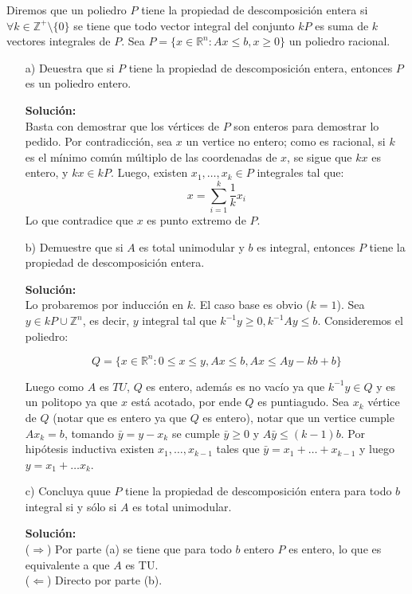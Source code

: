\documentclass[10pt]{article}
\theoremstyle{plain}
\theoremstyle{definition}
\begin{document}
Diremos que un poliedro $P$ tiene la propiedad de descomposición entera si $\forall k \in \mathbb{Z}^{+}\setminus\{0\}$ se tiene que todo vector integral del conjunto $kP$ es suma de $k$ vectores integrales de $P$. Sea $P=\{x\in\mathbb{R}^{n}: Ax\leq b, x\geq 0\}$ un poliedro racional.
\begin{itemize}
    \item[a)] Deuestra que si $P$ tiene la propiedad de descomposición entera, entonces $P$ es un poliedro entero.
    
    \textbf{Solución:}\\
    Basta con demostrar que los vértices de $P$ son enteros para demostrar lo pedido. Por contradicción, sea $x$ un vertice no entero; como es racional, si $k$ es el mínimo común múltiplo de las coordenadas de $x$, se sigue que $kx$ es entero, y $kx\in kP$. Luego, existen $x_{1},\ldots, x_{k}\in P$ integrales tal que:
    \begin{equation*}
        x=\sum_{i=1}^{k}\frac{1}{k}x_{i}
    \end{equation*}
    Lo que contradice que $x$ es punto extremo de $P$.
    \item[b)] Demuestre que si $A$ es total unimodular y $b$ es integral, entonces $P$ tiene la propiedad de descomposición entera.
    
    \textbf{Solución:}\\
    Lo probaremos por inducción en $k$. El caso base es obvio ($k=1$). Sea $y\in kP\cup\mathbb{Z}^{n}$, es decir, $y$ integral tal que $k^{-1}y\geq 0, k^{-1}Ay\leq b$. Consideremos el poliedro:

    \begin{equation*}
    Q = \{x\in \mathbb{R}^{n}:0\leq x \leq y, Ax\leq b, Ax\leq Ay-kb+b\} 
    \end{equation*}

    Luego como $A$ es $TU$, $Q$ es entero, además es no vacío ya que $k^{-1}y\in Q$ y es un politopo ya que $x$ está acotado, por ende $Q$ es puntiagudo. Sea $x_{k}$ vértice de $Q$ (notar que es entero ya que $Q$ es entero), notar que un vertice cumple $Ax_{k}=b$, tomando $\bar{y}=y-x_{k}$ se cumple $\bar{y}\geq0$ y $A\bar{y}\leq(k-1)b$. Por hipótesis inductiva existen $x_{1},\ldots, x_{k-1}$ tales que $\bar{y}=x_{1}+\ldots+x_{k-1}$ y luego $y=x_{1}+\ldots x_{k}$.

    \item[c)] Concluya quue $P$ tiene la propiedad de descomposición entera para todo $b$ integral si y sólo si $A$ es total unimodular.
    
    \textbf{Solución:}\\
    ($\Longrightarrow$) Por parte (a) se tiene que para todo $b$ entero $P$ es entero, lo que es equivalente a que $A$ es TU.\\
    ($\Longleftarrow$) Directo por parte (b).

\end{itemize}
\end{document}
